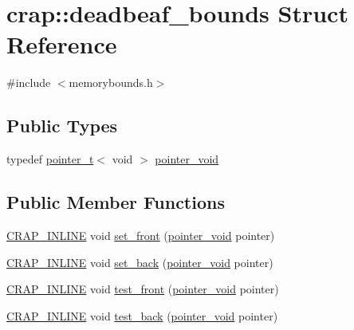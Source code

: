 \hypertarget{structcrap_1_1deadbeaf__bounds}{\section{crap\+:\+:deadbeaf\+\_\+bounds Struct Reference}
\label{structcrap_1_1deadbeaf__bounds}
}


{\ttfamily \#include $<$memorybounds.\+h$>$}

\subsection*{Public Types}
\begin{DoxyCompactItemize}
\item 
typedef \hyperlink{structcrap_1_1pointer__t}{pointer\+\_\+t}$<$ void $>$ \hyperlink{structcrap_1_1deadbeaf__bounds_ab42e3320a8d0a0039e0939887805fc32}{pointer\+\_\+void}
\end{DoxyCompactItemize}
\subsection*{Public Member Functions}
\begin{DoxyCompactItemize}
\item 
\hyperlink{config__x86_8h_a5a40526b8d842e7ff731509998bb0f1c}{C\+R\+A\+P\+\_\+\+I\+N\+L\+I\+N\+E} void \hyperlink{structcrap_1_1deadbeaf__bounds_adde058c6ef61f0812ff8f9f18805947c}{set\+\_\+front} (\hyperlink{structcrap_1_1deadbeaf__bounds_ab42e3320a8d0a0039e0939887805fc32}{pointer\+\_\+void} pointer)
\item 
\hyperlink{config__x86_8h_a5a40526b8d842e7ff731509998bb0f1c}{C\+R\+A\+P\+\_\+\+I\+N\+L\+I\+N\+E} void \hyperlink{structcrap_1_1deadbeaf__bounds_ad6087771e5f72de081c551a85ad16ea6}{set\+\_\+back} (\hyperlink{structcrap_1_1deadbeaf__bounds_ab42e3320a8d0a0039e0939887805fc32}{pointer\+\_\+void} pointer)
\item 
\hyperlink{config__x86_8h_a5a40526b8d842e7ff731509998bb0f1c}{C\+R\+A\+P\+\_\+\+I\+N\+L\+I\+N\+E} void \hyperlink{structcrap_1_1deadbeaf__bounds_a783d317ac4507d5e683c2534991301db}{test\+\_\+front} (\hyperlink{structcrap_1_1deadbeaf__bounds_ab42e3320a8d0a0039e0939887805fc32}{pointer\+\_\+void} pointer)
\item 
\hyperlink{config__x86_8h_a5a40526b8d842e7ff731509998bb0f1c}{C\+R\+A\+P\+\_\+\+I\+N\+L\+I\+N\+E} void \hyperlink{structcrap_1_1deadbeaf__bounds_a51a464e98298278b46a2593644fbe1cb}{test\+\_\+back} (\hyperlink{structcrap_1_1deadbeaf__bounds_ab42e3320a8d0a0039e0939887805fc32}{pointer\+\_\+void} pointer)
\end{DoxyCompactItemize}

